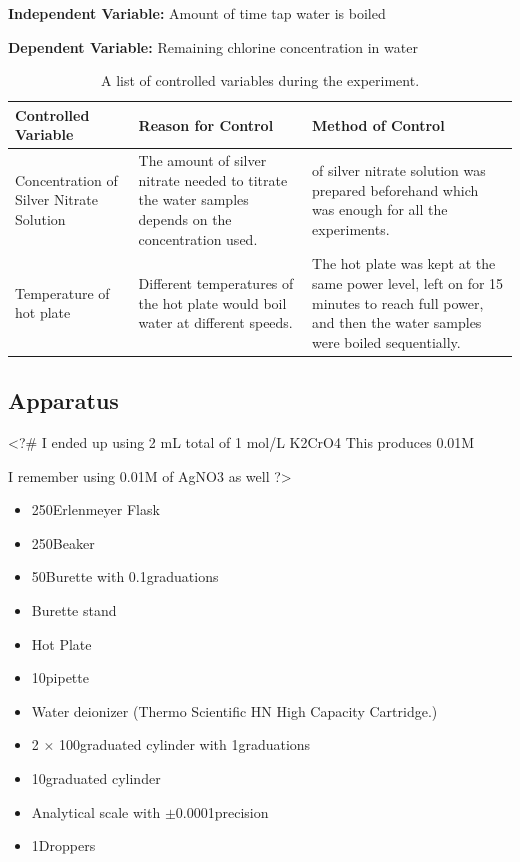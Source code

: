 \documentclass[11pt]{article}
\begin{document}
\textbf{Independent Variable:} Amount of time tap water is boiled

\textbf{Dependent Variable:} Remaining chlorine concentration in water

\begin{table}[H]
	\def\arraystretch{1.5}
	\caption{A list of controlled variables during the experiment.}
	\begin{tabularx}{\linewidth}{|
			>{\RaggedRight}X|
			>{\RaggedRight}X|
			>{\RaggedRight}X|
		}
		\hline
		\textbf{Controlled Variable}
		 & \textbf{Reason for Control}
		 & \textbf{Method of Control}
		\\\hline
		Concentration of Silver Nitrate Solution
		 & The amount of silver nitrate needed to titrate the water samples depends on the concentration used.
		 & 50\ml of silver nitrate solution was prepared beforehand which was enough for all the experiments.
		\\\hline
		Temperature of hot plate
		 & Different temperatures of the hot plate would boil water at different speeds.
		 & The hot plate was kept at the same power level, left on for 15 minutes to reach full power, and then the water samples were boiled sequentially.
		\\\hline
	\end{tabularx}
\end{table}

\subsection{Apparatus}

<?#
I ended up using 2 mL total of 1 mol/L K2CrO4
This produces 0.01M

I remember using 0.01M of AgNO3 as well
?>

\begin{itemize}
	\item 250\ml Erlenmeyer Flask
	\item 250\ml Beaker
	\item 50\ml Burette with 0.1\ml graduations
	\item Burette stand
	\item Hot Plate
	\item 10\ml pipette
	\item Water deionizer (Thermo Scientific HN High Capacity Cartridge.)
	\item 2 $\times$ 100\ml graduated cylinder with 1\ml graduations
	\item 10\ml graduated cylinder
	\item Analytical scale with $\pm$0.0001\gram precision
	\item 1\ml Droppers
\end{itemize}
\end{document}
